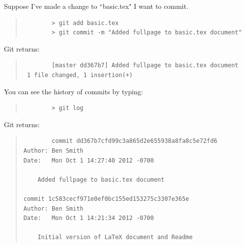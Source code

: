 Suppose I've made a change to ``basic.tex" I want to commit.

\begin{quote}
	\begin{verbatim}
		> git add basic.tex
		> git commit -m "Added fullpage to basic.tex document"
	\end{verbatim}
\end{quote}

Git returns:

\begin{quote}
	\begin{verbatim}
		[master dd367b7] Added fullpage to basic.tex document
 1 file changed, 1 insertion(+)
	\end{verbatim}
\end{quote}

You can see the history of commits by typing:

\begin{quote}
	\begin{verbatim}
		> git log
	\end{verbatim}
\end{quote}

Git returns:

\begin{quote}
	\begin{verbatim}
		commit dd367b7cfd99c3a865d2e655938a8fa8c5e72fd6
Author: Ben Smith 
Date:   Mon Oct 1 14:27:40 2012 -0700

    Added fullpage to basic.tex document

commit 1c583cecf971e0ef0bc155ed153275c3307e365e
Author: Ben Smith 
Date:   Mon Oct 1 14:21:34 2012 -0700

    Initial version of LaTeX document and Readme
	\end{verbatim}
\end{quote}

 
